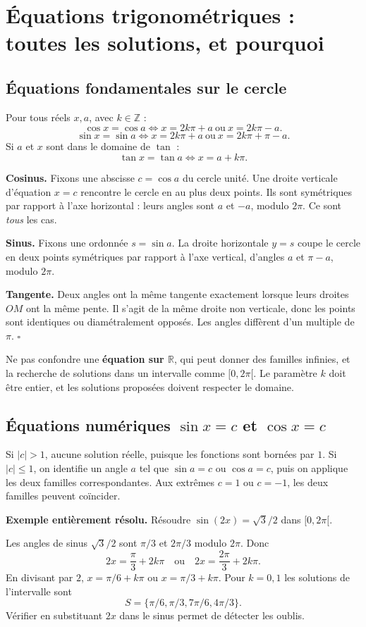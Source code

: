\documentclass[../cours_spe_trigo.tex]{subfiles}
\begin{document}
\setcounter{chapter}{10}
\chapter{Équations trigonométriques : toutes les solutions, et pourquoi}
\section{Équations fondamentales sur le cercle}
\begin{propriete}
Pour tous réels $x,a$, avec $k\in\mathbb Z$ :
\[
\boxed{\cos x=\cos a\iff x=2k\pi+a\ \text{ou}\ x=2k\pi-a.}
\]
\[
\boxed{\sin x=\sin a\iff x=2k\pi+a\ \text{ou}\ x=2k\pi+\pi-a.}
\]
Si $a$ et $x$ sont dans le domaine de $\tan$ :
\[
\boxed{\tan x=\tan a\iff x=a+k\pi.}
\]
\end{propriete}
\begin{demonstration}
\textbf{Cosinus.} Fixons une abscisse $c=\cos a$ du cercle unité. Une droite verticale d'équation $x=c$ rencontre le cercle en au plus deux points. Ils sont symétriques par rapport à l'axe horizontal : leurs angles sont $a$ et $-a$, modulo $2\pi$. Ce sont \emph{tous} les cas.

\textbf{Sinus.} Fixons une ordonnée $s=\sin a$. La droite horizontale $y=s$ coupe le cercle en deux points symétriques par rapport à l'axe vertical, d'angles $a$ et $\pi-a$, modulo $2\pi$.

\textbf{Tangente.} Deux angles ont la même tangente exactement lorsque leurs droites $OM$ ont la même pente. Il s'agit de la même droite non verticale, donc les points sont identiques ou diamétralement opposés. Les angles diffèrent d'un multiple de $\pi$. $\square$
\end{demonstration}
\begin{attention}
Ne pas confondre une \textbf{équation sur $\mathbb R$}, qui peut donner des familles infinies, et la recherche de solutions dans un intervalle comme $[0,2\pi[$. Le paramètre $k$ doit être entier, et les solutions proposées doivent respecter le domaine.
\end{attention}

\section{Équations numériques $\sin x=c$ et $\cos x=c$}
Si $|c|>1$, aucune solution réelle, puisque les fonctions sont bornées par $1$. Si $|c|\le1$, on identifie un angle $a$ tel que $\sin a=c$ ou $\cos a=c$, puis on applique les deux familles correspondantes. Aux extrêmes $c=1$ ou $c=-1$, les deux familles peuvent coïncider.
\begin{methode}
\textbf{Exemple entièrement résolu.} Résoudre $\sin(2x)=\sqrt3/2$ dans $[0,2\pi[$.

Les angles de sinus $\sqrt3/2$ sont $\pi/3$ et $2\pi/3$ modulo $2\pi$. Donc
\[
2x=\frac\pi3+2k\pi\quad\text{ou}\quad 2x=\frac{2\pi}3+2k\pi.
\]
En divisant par $2$, $x=\pi/6+k\pi$ ou $x=\pi/3+k\pi$. Pour $k=0,1$ les solutions de l'intervalle sont
\[\boxed{S=\{\pi/6,\pi/3,7\pi/6,4\pi/3\}.}\]
Vérifier en substituant $2x$ dans le sinus permet de détecter les oublis.
\end{methode}
\end{document}

